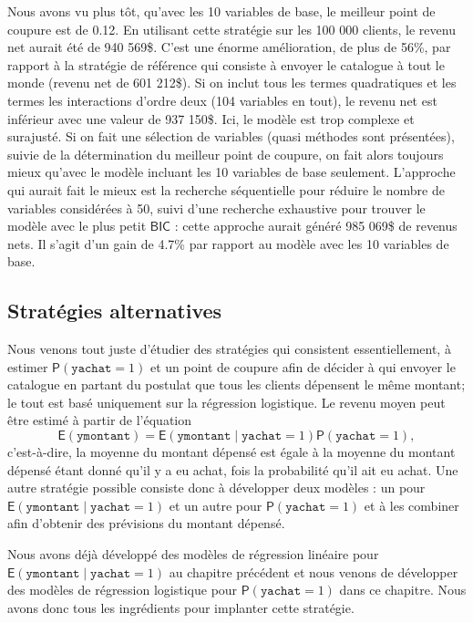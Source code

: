 \documentclass[
  11pt,
  letterpaper,
]{book}
\theoremstyle{definition}
\theoremstyle{definition}
\theoremstyle{definition}
\theoremstyle{definition}
\theoremstyle{remark}
\begin{document}
Nous avons vu plus tôt, qu'avec les 10 variables de base, le meilleur point de coupure est de 0.12. En utilisant cette stratégie sur les 100 000 clients, le revenu net aurait été de 940 569\$. C'est une énorme amélioration, de plus de 56\%, par rapport à la stratégie de référence qui consiste à envoyer le catalogue à tout le monde (revenu net de 601 212\$). Si on inclut tous les termes quadratiques et les termes les interactions d'ordre deux (104 variables en tout), le revenu net est inférieur avec une valeur de 937 150\$. Ici, le modèle est trop complexe et surajusté. Si on fait une sélection de variables (quasi méthodes sont présentées), suivie de la détermination du meilleur point de coupure, on fait alors toujours mieux qu'avec le modèle incluant les 10 variables de base seulement. L'approche qui aurait fait le mieux est la recherche séquentielle pour réduire le nombre de variables considérées à 50, suivi d'une recherche exhaustive pour trouver le modèle avec le plus petit \(\mathsf{BIC}\) : cette approche aurait généré 985 069\$ de revenus nets. Il s'agit d'un gain de 4.7\% par rapport au modèle avec les 10 variables de base.

\hypertarget{stratuxe9gies-alternatives}{%
\subsection{Stratégies alternatives}\label{stratuxe9gies-alternatives}}

Nous venons tout juste d'étudier des stratégies qui consistent essentiellement, à estimer \({\mathsf P}\left(\texttt{yachat}=1\right)\) et un point de coupure afin de décider à qui envoyer le catalogue en partant du postulat que tous les clients dépensent le même montant; le tout est basé uniquement sur la régression logistique. Le revenu moyen peut être estimé à partir de l'équation
\[{\mathsf E}\left(\texttt{ymontant}\right) = {\mathsf E}\left(\texttt{ymontant} \mid \texttt{yachat}=1\right) {\mathsf P}\left(\texttt{yachat
}=1\right),
\]
c'est-à-dire, la moyenne du montant dépensé est égale à la moyenne du montant dépensé étant donné qu'il y a eu achat, fois la probabilité qu'il ait eu achat. Une autre stratégie possible consiste donc à développer deux modèles : un pour \({\mathsf E}\left(\texttt{ymontant} \mid \texttt{yachat}=1\right)\) et un autre pour \({\mathsf P}\left(\texttt{yachat}=1\right)\) et à les combiner afin d'obtenir des prévisions du montant dépensé.

Nous avons déjà développé des modèles de régression linéaire pour \({\mathsf E}\left(\texttt{ymontant} \mid \texttt{yachat}=1\right)\) au chapitre précédent et nous venons de développer des modèles de régression logistique pour \({\mathsf P}\left(\texttt{yachat}=1\right)\) dans ce chapitre. Nous avons donc tous les ingrédients pour implanter cette stratégie.
\end{document}
